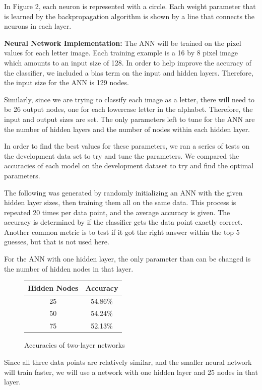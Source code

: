 \documentclass[11pt,letterpaper]{article}
\begin{document}
In Figure 2, each neuron is represented with a circle. Each weight parameter that is learned by the
backpropagation algorithm is shown by a line that connects the neurons in each layer.

{\bf Neural Network Implementation:} The ANN will be trained on the pixel values for each letter image. Each training example is a 16 by
8 pixel image which amounts to an input size of 128. In order to help improve the accuracy of the
classifier, we included a bias term on the input and hidden layers. Therefore, the input size for
the ANN is 129 nodes.

Similarly, since we are trying to classify each image as a letter, there will need to be 26 output
nodes, one for each lowercase letter in the alphabet. Therefore, the input and output sizes are set.
The only parameters left to tune for the ANN are the number of hidden layers and the number of nodes
within each hidden layer.

In order to find the best values for these parameters, we ran a series of tests on the development
data set to try and tune the parameters. We compared the accuracies of each model on the development
dataset to try and find the optimal parameters.

The following was generated by randomly initializing an ANN with the given hidden layer sizes, then
training them all on the same data. This process is repeated 20 times per data point, and the
average accuracy is given. The accuracy is determined by if the classifier gets the data point
exactly correct. Another common metric is to test if it got the right answer within the top 5
guesses, but that is not used here.

For the ANN with one hidden layer, the only parameter than can be changed is the number of hidden nodes in that layer.

\begin{figure}[h]
    \caption{Accuracies of two-layer networks}
    \centering
    \begin{tabular}{|c|c|}
        \hline 
        Hidden Nodes & Accuracy \\ 
        \hline 
        25 & 54.86\% \\ 
        \hline 
        50 & 54.24\% \\ 
        \hline 
        75 & 52.13\% \\ 
        \hline 
    \end{tabular} 
\end{figure}

Since all three data points are relatively similar, and the smaller neural
network will train faster, we will use a network with one hidden layer and 25 nodes
in that layer.
\end{document}
